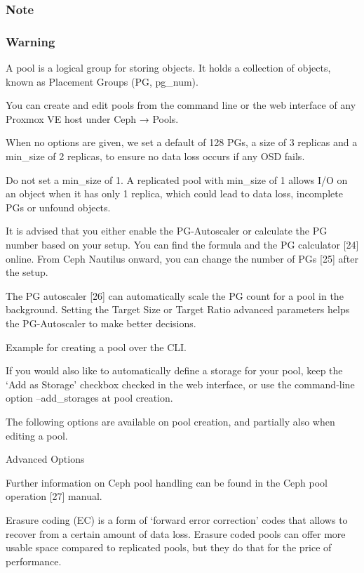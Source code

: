 \subsubsection{Note}

\subsubsection{Warning}

A pool is a logical group for storing objects. It holds a collection of objects, known as Placement Groups (PG, pg_num).

You can create and edit pools from the command line or the web interface of any Proxmox VE host under Ceph → Pools.

When no options are given, we set a default of 128 PGs, a size of 3 replicas and a min_size of 2 replicas, to ensure no data loss occurs if any OSD fails.

Do not set a min_size of 1. A replicated pool with min_size of 1 allows I/O on an object when it has only 1 replica, which could lead to data loss, incomplete PGs or unfound objects.

It is advised that you either enable the PG-Autoscaler or calculate the PG number based on your setup. You can find the formula and the PG calculator [24] online. From Ceph Nautilus onward, you can change the number of PGs [25] after the setup.

The PG autoscaler [26] can automatically scale the PG count for a pool in the background. Setting the Target Size or Target Ratio advanced parameters helps the PG-Autoscaler to make better decisions.

Example for creating a pool over the CLI.

If you would also like to automatically define a storage for your pool, keep the ‘Add as Storage’ checkbox checked in the web interface, or use the command-line option --add_storages at pool creation.

The following options are available on pool creation, and partially also when editing a pool.

Advanced Options

Further information on Ceph pool handling can be found in the Ceph pool operation [27] manual.

Erasure coding (EC) is a form of ‘forward error correction’ codes that allows to recover from a certain amount of data loss. Erasure coded pools can offer more usable space compared to replicated pools, but they do that for the price of performance.

